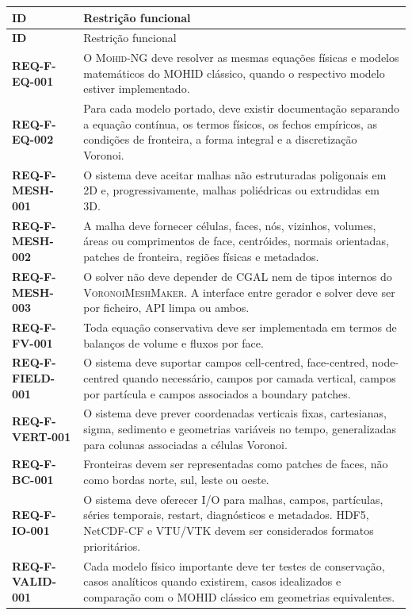 \documentclass[11pt,a4paper]{article}
\newcommand{\req}[1]{\textsf{\textbf{#1}}}
\newcommand{\mohidng}{\textsc{Mohid-NG}}
\newcommand{\vmm}{\textsc{VoronoiMeshMaker}}
\begin{document}
\begin{longtable}{>{\sffamily\bfseries}p{}p{}}
\toprule
ID & Restrição funcional \\
\midrule
\endfirsthead
\toprule
ID & Restrição funcional \\
\midrule
\endhead
\req{REQ-F-EQ-001} & O \mohidng{} deve resolver as mesmas equações físicas e modelos matemáticos do MOHID clássico, quando o respectivo modelo estiver implementado. \\
\req{REQ-F-EQ-002} & Para cada modelo portado, deve existir documentação separando a equação contínua, os termos físicos, os fechos empíricos, as condições de fronteira, a forma integral e a discretização Voronoi. \\
\req{REQ-F-MESH-001} & O sistema deve aceitar malhas não estruturadas poligonais em 2D e, progressivamente, malhas poliédricas ou extrudidas em 3D. \\
\req{REQ-F-MESH-002} & A malha deve fornecer células, faces, nós, vizinhos, volumes, áreas ou comprimentos de face, centróides, normais orientadas, patches de fronteira, regiões físicas e metadados. \\
\req{REQ-F-MESH-003} & O solver não deve depender de CGAL nem de tipos internos do \vmm{}. A interface entre gerador e solver deve ser por ficheiro, API limpa ou ambos. \\
\req{REQ-F-FV-001} & Toda equação conservativa deve ser implementada em termos de balanços de volume e fluxos por face. \\
\req{REQ-F-FIELD-001} & O sistema deve suportar campos cell-centred, face-centred, node-centred quando necessário, campos por camada vertical, campos por partícula e campos associados a boundary patches. \\
\req{REQ-F-VERT-001} & O sistema deve prever coordenadas verticais fixas, cartesianas, sigma, sedimento e geometrias variáveis no tempo, generalizadas para colunas associadas a células Voronoi. \\
\req{REQ-F-BC-001} & Fronteiras devem ser representadas como patches de faces, não como bordas norte, sul, leste ou oeste. \\
\req{REQ-F-IO-001} & O sistema deve oferecer I/O para malhas, campos, partículas, séries temporais, restart, diagnósticos e metadados. HDF5, NetCDF-CF e VTU/VTK devem ser considerados formatos prioritários. \\
\req{REQ-F-VALID-001} & Cada modelo físico importante deve ter testes de conservação, casos analíticos quando existirem, casos idealizados e comparação com o MOHID clássico em geometrias equivalentes. \\
\bottomrule
\end{longtable}
\end{document}
